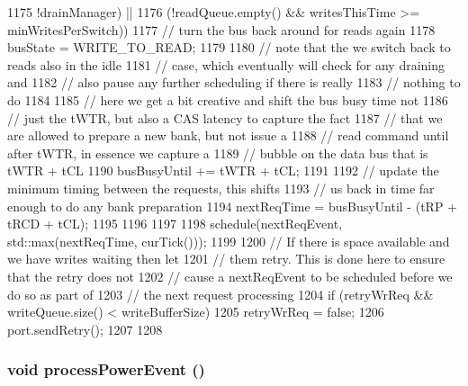 \begin{DoxyCode}
{{1175              !drainManager) ||
1176             (!readQueue.empty() && writesThisTime >= minWritesPerSwitch)) {
1177             // turn the bus back around for reads again
1178             busState = WRITE_TO_READ;
1179 
1180             // note that the we switch back to reads also in the idle
1181             // case, which eventually will check for any draining and
1182             // also pause any further scheduling if there is really
1183             // nothing to do
1184 
1185             // here we get a bit creative and shift the bus busy time not
1186             // just the tWTR, but also a CAS latency to capture the fact
1187             // that we are allowed to prepare a new bank, but not issue a
1188             // read command until after tWTR, in essence we capture a
1189             // bubble on the data bus that is tWTR + tCL
1190             busBusyUntil += tWTR + tCL;
1191 
1192             // update the minimum timing between the requests, this shifts
1193             // us back in time far enough to do any bank preparation
1194             nextReqTime = busBusyUntil - (tRP + tRCD + tCL);
1195         }
1196     }
1197 
1198     schedule(nextReqEvent, std::max(nextReqTime, curTick()));
1199 
1200     // If there is space available and we have writes waiting then let
1201     // them retry. This is done here to ensure that the retry does not
1202     // cause a nextReqEvent to be scheduled before we do so as part of
1203     // the next request processing
1204     if (retryWrReq && writeQueue.size() < writeBufferSize) {
1205         retryWrReq = false;
1206         port.sendRetry();
1207     }
1208 }
\end{DoxyCode}
\hypertarget{classDRAMCtrl_a969289183ebadcc99a8dd9f63120b4eb}{
\subsubsection[{processPowerEvent}]{\setlength{\rightskip}{0pt plus 5cm}void processPowerEvent ()}}
\label{classDRAMCtrl_a969289183ebadcc99a8dd9f63120b4eb}



